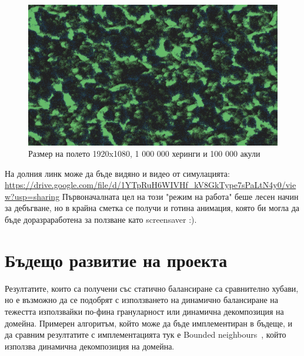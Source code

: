 \documentclass[12pt]{article}
\begin{document}
\begin{figure}[H]
	\centering
	\includegraphics[width=1\textwidth]{screenshot-big.png}
	\caption{Размер на полето 1920x1080, 1 000 000 херинги и 100 000 акули}
\end{figure}

На долния линк може да бъде видяно и видео от симулацията:\\
\url{https://drive.google.com/file/d/1YTpRuH6WIVHf_kV8GkType7sPaLtN4y0/view?usp=sharing}
\bigbreak
Първоначалната цел на този "режим на работа" беше лесен начин за дебъгване,
но в крайна сметка се получи и готина анимация, която би могла да бъде доразраработена за ползване като screensaver :).

\section{Бъдещо развитие на проекта}
Резултатите, които са получени със статично балансиране са сравнително хубави,
но е възможно да се подобрят с използването на динамично балансиране на тежестта използвайки
по-фина грануларност или динамична декомпозиция на домейна. Примерен алгоритъм, който може да бъде
имплементиран в бъдеще, и да сравним резултатите с имплементацията тук
е Bounded neighbours~\cite{bounded_neighbours}, който използва динамична декомпозиция на домейна.
{}

\end{document}

